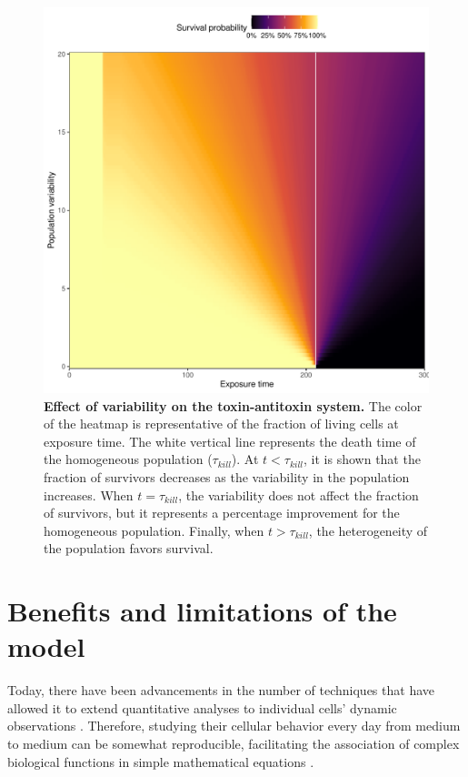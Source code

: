 \documentclass[a4paper, nobind]{templates/ociamthesis}
\begin{document}
\begin{figure}[H]
\includegraphics[width=1\linewidth]{downloadFigs4latex__main/survival-probability} \caption[Effect of variability on the toxin-antitoxin system.]{\textbf{Effect of variability on the toxin-antitoxin system.} The color of the heatmap is representative of the fraction of living cells at exposure time. The white vertical line represents the death time of the homogeneous population (\(\tau_{kill}\)). At \(t < \tau_{kill}\), it is shown that the fraction of survivors decreases as the variability in the population increases. When \(t = \tau_{kill}\), the variability does not affect the fraction of survivors, but it represents a percentage improvement for the homogeneous population. Finally, when \(t > \tau_{kill}\), the heterogeneity of the population favors survival.}\label{fig:survival-probability}
\end{figure}

\hypertarget{benefits-and-limitations-of-the-model}{%
\section{Benefits and limitations of the model}\label{benefits-and-limitations-of-the-model}}

Today, there have been advancements in the number of techniques that have allowed it to extend quantitative analyses to individual cells' dynamic observations \autocite{camposConstantSizeExtension2014,meldrumFacultyOpinionsRecommendation2005,sliusarenkoHighthroughputSubpixelPrecision2011,taheri-araghiCellSizeControlHomeostasis2017,ursellRapidPreciseQuantification2017}.
Therefore, studying their cellular behavior every day from medium to medium can be somewhat reproducible, facilitating the association of complex biological functions in simple mathematical equations \autocite{neidhardtBacterialGrowthConstant1999}.
\end{document}
